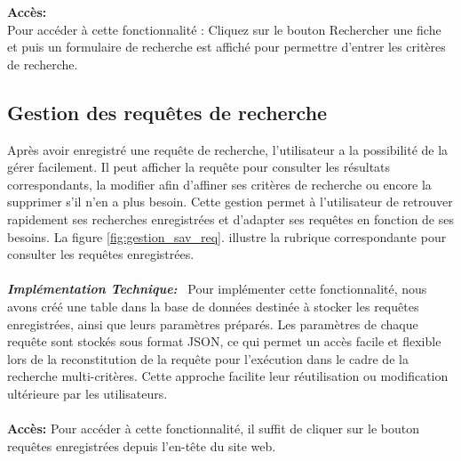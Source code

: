\documentclass[12pt]{article}
\begin{document}
    \textbf{Accès: } \\
    Pour accéder à cette fonctionnalité : Cliquez sur le bouton Rechercher une fiche et puis un formulaire de recherche est affiché pour permettre d'entrer les critères de recherche.

    \subsection{Gestion des requêtes de recherche}
    Après avoir enregistré une requête de recherche, l'utilisateur a la possibilité de la gérer facilement. Il peut afficher la requête pour consulter les résultats correspondants, la modifier afin d'affiner ses critères de recherche ou encore la supprimer s'il n'en a plus besoin. Cette gestion permet à l'utilisateur de retrouver rapidement ses recherches enregistrées et d'adapter ses requêtes en fonction de ses besoins.
    La figure \ref{fig:gestion_sav_req}. illustre la rubrique correspondante pour consulter les requêtes enregistrées.
    \\
    \\ \textit{\textbf{Implémentation Technique:}} \ Pour implémenter cette fonctionnalité, nous avons créé une table dans la base de données destinée à stocker les requêtes enregistrées, ainsi que leurs paramètres préparés. Les paramètres de chaque requête sont stockés sous format JSON, ce qui permet un accès facile et flexible lors de la reconstitution de la requête pour l'exécution dans le cadre de la recherche multi-critères. Cette approche facilite leur réutilisation ou modification ultérieure par les utilisateurs.\\
    \\
    \textbf{Accès:} Pour accéder à cette fonctionnalité, il suffit de cliquer sur le bouton requêtes enregistrées depuis l'en-tête du site web.
\end{document}
